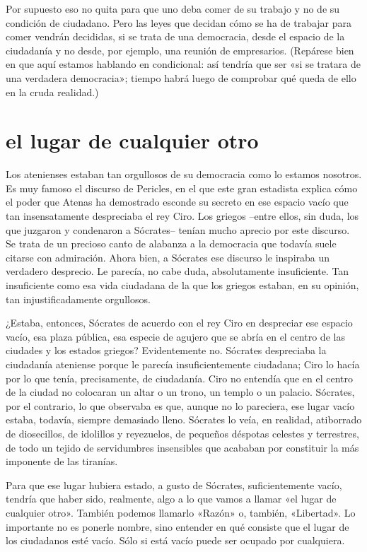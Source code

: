 \documentclass[draft,9pt,letterpaper,twocolumn,openany]{extbook}
\newcommand{\notar}[1]{\marginnote{\small\sffamily #1}[-.8em]}
\begin{document}
Por supuesto eso no quita para que uno deba comer de su trabajo y no de
su condición de ciudadano. Pero las leyes que decidan cómo
se ha de trabajar para comer vendrán decididas, si se trata de
una democracia, desde el espacio de la ciudadanía y no
desde, por ejemplo, una reunión de empresarios. (Repárese
bien en que aquí estamos hablando en condicional: así tendría
que ser «si se tratara de una verdadera democracia»; tiempo
habrá luego de comprobar qué queda de ello en la cruda
realidad.)

\section{el lugar de cualquier otro}


Los atenienses estaban tan orgullosos de su democracia
como lo estamos nosotros. Es muy famoso el discurso de
Pericles, en el que este gran estadista explica cómo el poder
que Atenas ha demostrado esconde su secreto en ese
espacio vacío que tan insensatamente despreciaba el rey
Ciro. Los griegos –entre ellos, sin duda, los que juzgaron y
condenaron a Sócrates– tenían mucho aprecio por este
discurso. Se trata de un precioso canto de alabanza a la
democracia que todavía suele citarse con admiración. Ahora
bien, a Sócrates ese discurso le inspiraba un verdadero
desprecio. Le parecía, no cabe duda, absolutamente
insuficiente. Tan insuficiente como esa vida ciudadana
de la que los griegos estaban, en su opinión, tan
injustificadamente orgullosos.

 ¿Estaba, entonces, Sócrates
de acuerdo con el rey Ciro en despreciar ese espacio vacío,
esa plaza pública, esa especie de agujero que se abría en el
centro de las ciudades y los estados griegos? Evidentemente
no. Sócrates despreciaba la ciudadanía ateniense porque le
parecía insuficientemente ciudadana; Ciro lo hacía por lo que
tenía, precisamente, de ciudadanía. Ciro no entendía que en
el centro de la ciudad no colocaran un altar o un trono, un
templo o un palacio. Sócrates, por el contrario, lo que
observaba es que, aunque no lo pareciera, ese lugar vacío
estaba, todavía, siempre demasiado lleno. Sócrates lo veía,
en realidad, atiborrado de diosecillos, de idolillos y
reyezuelos, de pequeños déspotas celestes y terrestres, de
todo un tejido de servidumbres insensibles que acababan
por constituir la más imponente de las tiranías.

Para que ese lugar hubiera estado, a gusto de Sócrates,
suficientemente vacío, tendría que haber sido,
realmente, algo a lo que vamos a llamar «el lugar de
cualquier otro». También podemos llamarlo «Razón» o,
también, «Libertad». Lo importante no es ponerle nombre,
sino entender en qué consiste que el lugar de los
ciudadanos esté vacío. Sólo si está vacío puede ser
ocupado por cualquiera.
\end{document}
